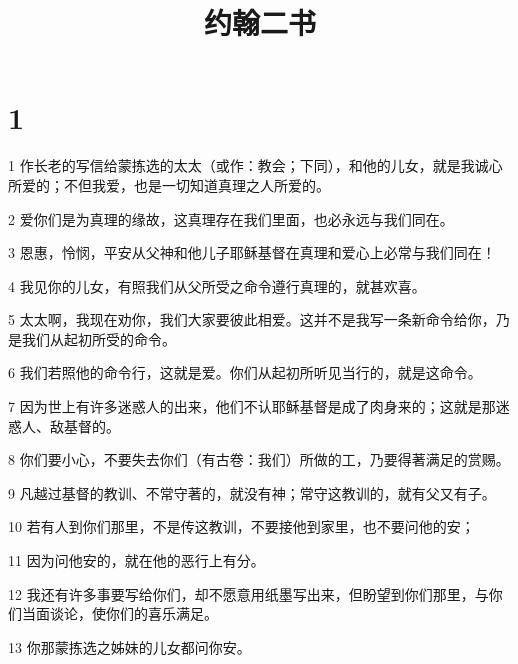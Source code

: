 

\title{约翰二书}


\chapter{1}

\par 1 作长老的写信给蒙拣选的太太（或作：教会；下同），和他的儿女，就是我诚心所爱的；不但我爱，也是一切知道真理之人所爱的。
\par 2 爱你们是为真理的缘故，这真理存在我们里面，也必永远与我们同在。
\par 3 恩惠，怜悯，平安从父神和他儿子耶稣基督在真理和爱心上必常与我们同在！
\par 4 我见你的儿女，有照我们从父所受之命令遵行真理的，就甚欢喜。
\par 5 太太啊，我现在劝你，我们大家要彼此相爱。这并不是我写一条新命令给你，乃是我们从起初所受的命令。
\par 6 我们若照他的命令行，这就是爱。你们从起初所听见当行的，就是这命令。
\par 7 因为世上有许多迷惑人的出来，他们不认耶稣基督是成了肉身来的；这就是那迷惑人、敌基督的。
\par 8 你们要小心，不要失去你们（有古卷：我们）所做的工，乃要得著满足的赏赐。
\par 9 凡越过基督的教训、不常守著的，就没有神；常守这教训的，就有父又有子。
\par 10 若有人到你们那里，不是传这教训，不要接他到家里，也不要问他的安；
\par 11 因为问他安的，就在他的恶行上有分。
\par 12 我还有许多事要写给你们，却不愿意用纸墨写出来，但盼望到你们那里，与你们当面谈论，使你们的喜乐满足。
\par 13 你那蒙拣选之姊妹的儿女都问你安。



